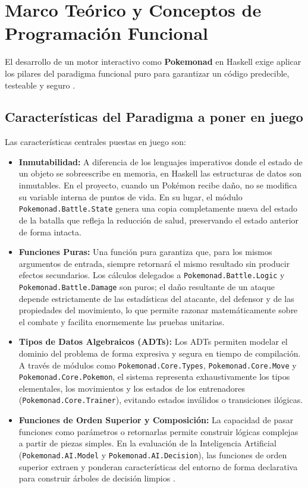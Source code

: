\section{Marco Teórico y Conceptos de Programación Funcional}

El desarrollo de un motor interactivo como \textbf{Pokemonad} en Haskell exige aplicar los pilares del paradigma funcional puro para garantizar un código predecible, testeable y seguro \cite{haskell2010}.

\subsection{Características del Paradigma a poner en juego}

Las características centrales puestas en juego son:

\begin{itemize}
    \item \textbf{Inmutabilidad:} A diferencia de los lenguajes imperativos donde el estado de un objeto se sobreescribe en memoria, en Haskell las estructuras de datos son inmutables. En el proyecto, cuando un Pokémon recibe daño, no se modifica su variable interna de puntos de vida. En su lugar, el módulo \texttt{Pokemonad.Battle.State} genera una copia completamente nueva del estado de la batalla que refleja la reducción de salud, preservando el estado anterior de forma intacta.
    \item \textbf{Funciones Puras:} Una función pura garantiza que, para los mismos argumentos de entrada, siempre retornará el mismo resultado sin producir efectos secundarios. Los cálculos delegados a \texttt{Pokemonad.Battle.Logic} y \texttt{Pokemonad.Battle.Damage} son puros; el daño resultante de un ataque depende estrictamente de las estadísticas del atacante, del defensor y de las propiedades del movimiento, lo que permite razonar matemáticamente sobre el combate y facilita enormemente las pruebas unitarias.
    \item \textbf{Tipos de Datos Algebraicos (ADTs):} Los ADTs permiten modelar el dominio del problema de forma expresiva y segura en tiempo de compilación. A través de módulos como \texttt{Pokemonad.Core.Types}, \texttt{Pokemonad.Core.Move} y \texttt{Pokemonad.Core.Pokemon}, el sistema representa exhaustivamente los tipos elementales, los movimientos y los estados de los entrenadores (\texttt{Pokemonad.Core.Trainer}), evitando estados inválidos o transiciones ilógicas.
    \item \textbf{Funciones de Orden Superior y Composición:} La capacidad de pasar funciones como parámetros o retornarlas permite construir lógicas complejas a partir de piezas simples. En la evaluación de la Inteligencia Artificial (\texttt{Pokemonad.AI.Model} y \texttt{Pokemonad.AI.Decision}), las funciones de orden superior extraen y ponderan características del entorno de forma declarativa para construir árboles de decisión limpios \cite{hutton2016}.

\end{itemize}
